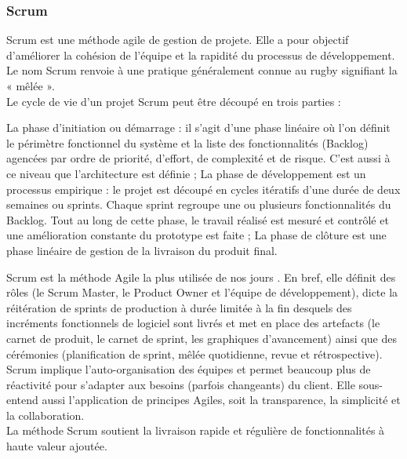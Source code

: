 \subsubsection{Scrum}
Scrum est une méthode agile de gestion de projete. Elle a pour objectif d’améliorer la cohésion de
l’équipe et la rapidité du processus de développement. Le nom Scrum renvoie à une pratique généralement connue au rugby signifiant la « mêlée ».\\
Le cycle de vie d’un projet Scrum peut être découpé en trois parties :
\begin{itemize}
	\itemcheck La phase d’initiation ou démarrage : il s’agit d’une phase linéaire où l’on
	définit le périmètre fonctionnel du système et la liste des fonctionnalités
	(Backlog) agencées par ordre de priorité, d’effort, de complexité et de risque.
	C’est aussi à ce niveau que l’architecture est définie ;
	\itemcheck La phase de développement est un processus empirique : le projet est découpé
	en cycles itératifs d’une durée de deux semaines ou sprints. Chaque sprint
	regroupe une ou plusieurs fonctionnalités du Backlog. Tout au long de cette
	phase, le travail réalisé est mesuré et contrôlé et une amélioration constante du
	prototype est faite ;
	\itemcheck La phase de clôture est une phase linéaire de gestion de la livraison du produit
	final.
\end{itemize}
Scrum est la méthode Agile la plus utilisée de nos jours \cite{scrum}. En bref, elle définit des rôles (le Scrum Master, le Product Owner et l’équipe de développement), dicte la réitération de sprints de production à durée limitée à la fin desquels des incréments fonctionnels de logiciel sont livrés et met en place des artefacts (le carnet de produit, le carnet de sprint, les graphiques d’avancement) ainsi que des cérémonies (planification de sprint, mêlée quotidienne, revue et rétrospective).
Scrum implique l’auto-organisation des équipes et permet beaucoup plus de réactivité pour s’adapter aux besoins (parfois changeants) du client. Elle sous-entend aussi l’application de principes Agiles, soit la transparence, la simplicité et la collaboration.\\
La méthode Scrum soutient la livraison rapide et régulière de fonctionnalités à haute valeur ajoutée.
